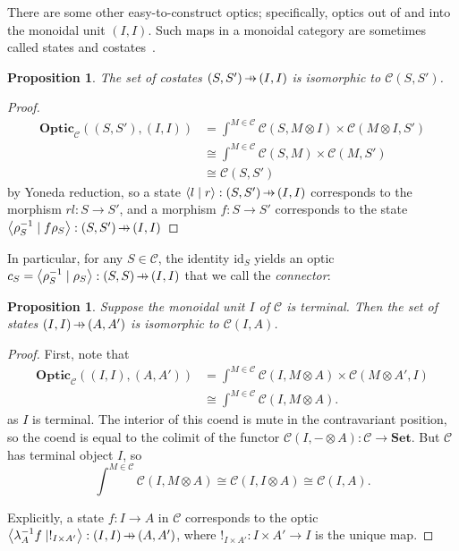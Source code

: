 \documentclass[11pt,letterpaper]{article}
\theoremstyle{plain}
\newtheorem{proposition}[theorem]{Proposition}
\theoremstyle{definition}
\newcommand{\C}{\mathscr{C}}
\newcommand{\Set}{\mathbf{Set}}
\newcommand{\Optic}{\mathbf{Optic}}
\newcommand{\id}{\mathrm{id}}
\newcommand{\rep}[2]{{\ensuremath \left\langle #1 \mid #2 \right\rangle}}
\newcommand{\hto}{\ensuremath{\,\mathaccent\shortmid\rightarrow\,}}
\begin{document}
There are some other easy-to-construct optics; specifically, optics out of  and into the monoidal unit $(I, I)$. Such maps in a monoidal category are sometimes called states and costates~\cite{CategoricalQuantumMechanics}.
\begin{proposition}\label{prop:costates}
  The set of costates $(S, S') \hto (I, I)$ is isomorphic to $\C(S, S')$.
\end{proposition}
\begin{proof}
  \begin{align*}
    \Optic_\C((S, S'), (I, I))
    &= \int^{M \in \C} \C(S, M \otimes I) \times \C(M \otimes I, S') \\
    &\cong \int^{M \in \C} \C(S, M) \times \C(M, S') \\
    &\cong \C(S, S')
  \end{align*}
  by Yoneda reduction, so a state $\rep{l}{r} : (S, S') \hto (I, I)$ corresponds to the morphism $rl : S \to S'$, and a morphism $f : S \to S'$ corresponds to the state $\rep{\rho_S^{-1}}{f \rho_S} : (S, S') \hto (I, I)$
\end{proof}

In particular, for any $S \in \C$, the identity $\id_S$ yields an optic $c_S = \rep{\rho_S^{-1}}{\rho_S} : (S, S) \hto (I, I)$ that we call the \emph{connector}:
%  
\begin{center}
  
\end{center}

\begin{proposition}\label{prop:states}
  Suppose the monoidal unit $I$ of $\C$ is terminal. Then the set of states $(I, I) \hto (A, A')$ is isomorphic to $\C(I, A)$.
\end{proposition}
\begin{proof}
  First, note that
  \begin{align*}
    \Optic_\C((I,I), (A,A'))
    &= \int^{M \in \C} \C(I, M \otimes A) \times \C(M \otimes A', I) \\
    &\cong \int^{M \in \C} \C(I, M \otimes A).
  \end{align*}
  as $I$ is terminal. The interior of this coend is mute in the contravariant position, so the coend is equal to the colimit of the functor $\C(I, - \otimes A) : \C \to \Set$. But $\C$ has terminal object $I$, so \[\int^{M \in \C} \C(I, M \otimes A) \cong \C(I, I \otimes A) \cong \C(I, A).\]
  
  Explicitly, a state $f : I \to A$ in $\C$ corresponds to the optic $\rep{\lambda_A^{-1} f}{!_{I \times A'}} : (I, I) \hto (A, A')$, where $!_{I \times A'} : I \times A' \to I$ is the unique map.
\end{proof}
\end{document}
